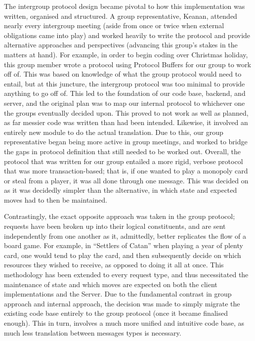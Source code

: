 \documentclass[a4paper,doc,draftfirst]{apa6}
\begin{document}
The intergroup protocol design became pivotal to how this implementation was written, organised and structured. A group representative, Keanan, attended nearly every intergroup meeting (aside from once or twice when external obligations came into play) and worked heavily to write the protocol and provide alternative approaches and perspectives (advancing this group’s stakes in the matters at hand). For example, in order to begin coding over Christmas holiday, this group member wrote a protocol using Protocol Buffers for our group to work off of. This was based on knowledge of what the group protocol would need to entail, but at this juncture, the intergroup protocol was too minimal to provide anything to go off of. This led to the foundation of our code base, backend, and server, and the original plan was to map our internal protocol to whichever one the groups eventually decided upon. This proved to not work as well as planned, as far messier code was written than had been intended. Likewise, it involved an entirely new module to do the actual translation. Due to this, our group representative began being more active in group meetings, and worked to bridge the gaps in protocol definition that still needed to be worked out. Overall, the protocol that was written for our group entailed a more rigid, verbose protocol that was more transaction-based; that is, if one wanted to play a monopoly card or steal from a player, it was all done through one message. This was decided on as it was decidedly simpler than the alternative, in which state and expected moves had to then be maintained.

Contrastingly, the exact opposite approach was taken in the group protocol; requests have been broken up into their logical constituents, and are sent independently from one another as it, admittedly, better replicates the flow of a board game. For example, in “Settlers of Catan” when playing a year of plenty card, one would tend to play the card, and then subsequently decide on which resources they wished to receive, as opposed to doing it all at once. This methodology has been extended to every request type, and thus necessitated the maintenance of state and which moves are expected on both the client implementations and the Server. Due to the fundamental contrast in group approach and internal approach, the decision was made to simply migrate the existing code base entirely to the group protocol (once it became finalised enough). This in turn, involves a much more unified and intuitive code base, as much less translation between messages types is necessary.
\end{document}

